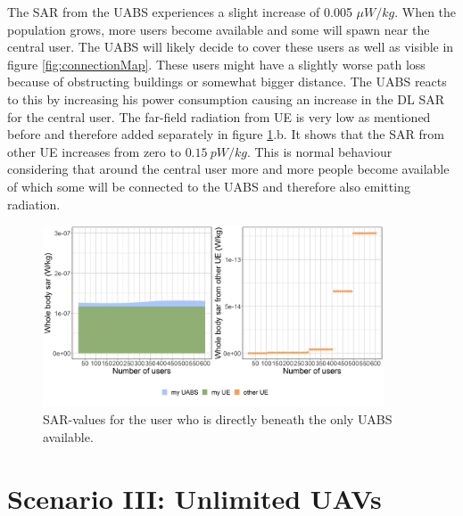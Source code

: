 The \gls{SAR} from the \gls{UABS} experiences a slight increase of 0.005 $\mu W/kg$. When the population grows, more users become available 
and some will spawn near the central user. The \gls{UABS} will likely decide to cover these users as well as visible in figure \ref{fig:connectionMap}.
These users might have a slightly 
worse path loss because of obstructing buildings or somewhat bigger distance. The \gls{UABS} reacts to this by increasing 
his power consumption causing an increase in the \gls{DL} \gls{SAR} for the central user.
The far-field radiation from \gls{UE} is very low as mentioned before and therefore added separately in figure \ref{fig:uvsulsarcentralUsers}.b.
It shows that the \gls{SAR}  from other \gls{UE} increases from zero to $0.15\ pW/kg$. This is normal 
behaviour considering that around the central user more and more people become available of which some will be connected to the \gls{UABS}
and therefore also emitting radiation.
\begin{figure}[hb]
\centering
  \includegraphics[width=0.9\textwidth]{../results/s2/uvsulsarcentralUser.png}
  \caption{SAR-values for the user who is directly beneath the only \acs{UABS} available.}
  \label{fig:uvsulsarcentralUsers}
\end{figure}

\FloatBarrier
\section{Scenario III: Unlimited \gls{UAV}s}
\label{s3}

